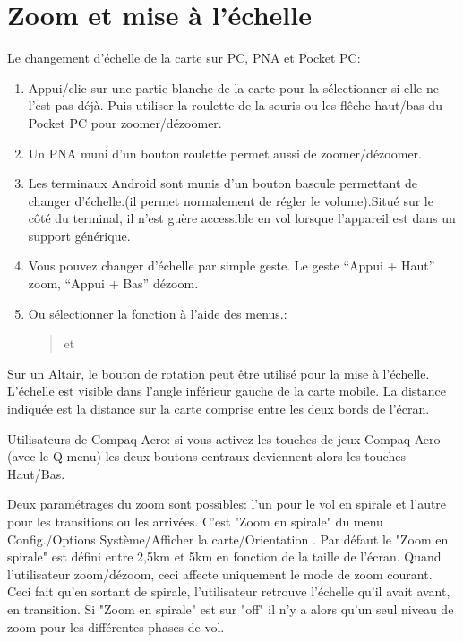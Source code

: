 \section{Zoom et mise à l'échelle}\label{sec:zooming}
Le changement d'échelle de la carte sur PC, PNA et Pocket PC:
\begin{enumerate}
\item Appui/clic sur une partie blanche de la carte pour la sélectionner si elle ne l'est pas déjà.
Puis utiliser la roulette de la souris ou les flêche haut/bas du Pocket PC pour zoomer/dézoomer.
\item Un PNA muni d'un bouton roulette permet aussi de zoomer/dézoomer.
\item Les terminaux Android sont munis d'un bouton bascule permettant de changer d'échelle.(il permet normalement de régler le volume).Situé sur le côté du terminal, il n'est guère accessible en vol lorsque l'appareil est dans un support générique.
\item Vous pouvez changer d'échelle par simple geste. Le geste  
``Appui + Haut'' zoom, ``Appui + Bas'' dézoom.
\item Ou sélectionner la fonction à l'aide des menus.:
\begin{quote}
\blink{} et \blink{}
\end{quote}
\end{enumerate}
Sur un Altair, le bouton de rotation peut être utilisé pour la mise à l'échelle.
L'échelle est visible dans l'angle inférieur gauche de la carte mobile.
La distance indiquée est la distance sur la carte comprise entre les deux bords de l'écran.

Utilisateurs de Compaq Aero: si vous activez les touches de jeux Compaq Aero (avec le Q-menu) les deux boutons centraux deviennent alors les touches Haut/Bas.
 
Deux paramétrages du zoom sont possibles: l'un pour le vol en spirale et l'autre pour les transitions ou les arrivées. C'est "Zoom en spirale" du menu Config./Options Système/Afficher la carte/Orientation  . Par défaut le  "Zoom en spirale" est défini entre 2,5km et 5km en fonction de la taille de l'écran. Quand l'utilisateur zoom/dézoom, ceci affecte uniquement le mode de zoom courant. Ceci fait qu'en sortant de spirale, l'utilisateur retrouve l'échelle qu'il avait avant, en transition. Si  "Zoom en spirale" est sur "off"  il n'y a alors qu'un seul niveau de zoom pour les différentes phases de vol.

